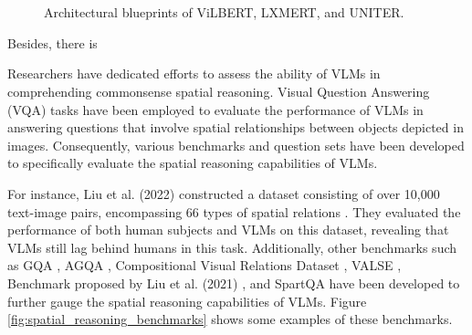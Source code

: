\documentclass[journal,10pt]{IEEEtran}
\begin{document}
\begin{figure}[htbp]
    \centering
    \\
    \\
    \caption{Architectural blueprints of ViLBERT, LXMERT, and UNITER.}
    \label{fig:VLMs}
\end{figure}

Besides, there is 

Researchers have dedicated efforts to assess the ability of VLMs in comprehending commonsense spatial reasoning. Visual Question Answering (VQA) tasks have been employed to evaluate the performance of VLMs in answering questions that involve spatial relationships between objects depicted in images\cite{7410636}. Consequently, various benchmarks and question sets have been developed to specifically evaluate the spatial reasoning capabilities of VLMs.

For instance, Liu et al. (2022) constructed a dataset consisting of over 10,000 text-image pairs, encompassing 66 types of spatial relations \cite{liu2022visual}. They evaluated the performance of both human subjects and VLMs on this dataset, revealing that VLMs still lag behind humans in this task. Additionally, other benchmarks such as GQA \cite{hudson2019gqa}, AGQA \cite{grunde2021agqa}, Compositional Visual Relations Dataset \cite{zerroug2022benchmark}, VALSE \cite{parcalabescu2021valse}, Benchmark proposed by Liu et al. (2021) \cite{liu2022things}, and SpartQA \cite{mirzaee2021spartqa} have been developed to further gauge the spatial reasoning capabilities of VLMs. Figure \ref{fig:spatial_reasoning_benchmarks} shows some examples of these benchmarks.
\end{document}
